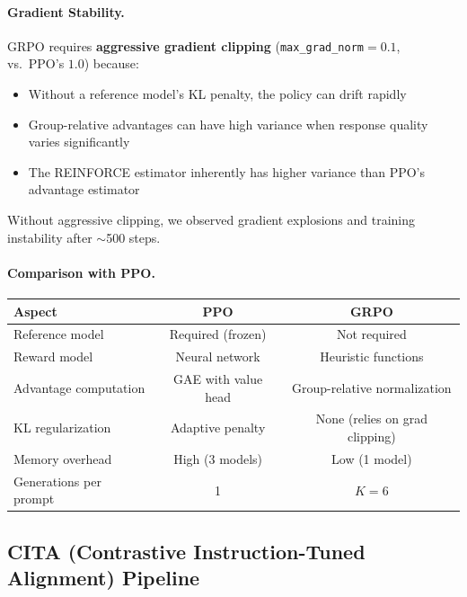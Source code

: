 \paragraph{Gradient Stability.} GRPO requires \textbf{aggressive gradient clipping} (\texttt{max\_grad\_norm}$=0.1$, vs.\ PPO's $1.0$) because:
\begin{itemize}[leftmargin=*]
    \item Without a reference model's KL penalty, the policy can drift rapidly
    \item Group-relative advantages can have high variance when response quality varies significantly
    \item The REINFORCE estimator inherently has higher variance than PPO's advantage estimator
\end{itemize}

Without aggressive clipping, we observed gradient explosions and training instability after $\sim$500 steps.

\paragraph{Comparison with PPO.}
\begin{center}
\begin{tabular}{lcc}
\toprule
\textbf{Aspect} & \textbf{PPO} & \textbf{GRPO} \\
\midrule
Reference model & Required (frozen) & Not required \\
Reward model & Neural network & Heuristic functions \\
Advantage computation & GAE with value head & Group-relative normalization \\
KL regularization & Adaptive penalty & None (relies on grad clipping) \\
Memory overhead & High (3 models) & Low (1 model) \\
Generations per prompt & 1 & $K=6$ \\
\bottomrule
\end{tabular}
\end{center}

\subsection{CITA (Contrastive Instruction-Tuned Alignment) Pipeline}
\label{sec:appendix_cita_pipeline}

